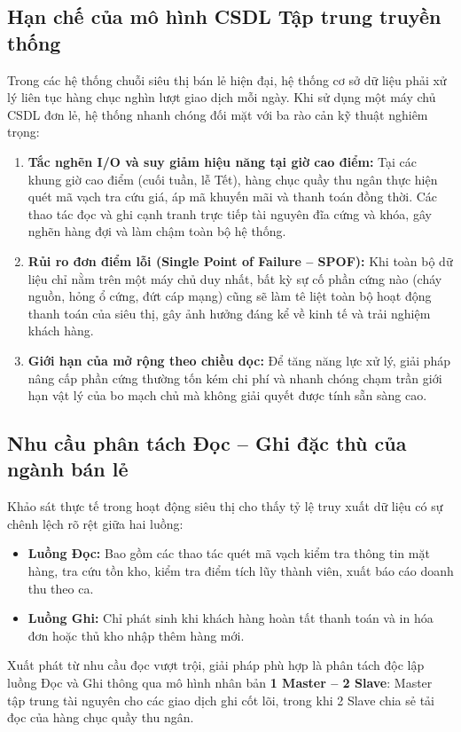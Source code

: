 \documentclass[12pt,a4paper]{report}
\begin{document}
\subsection{Hạn chế của mô hình CSDL Tập trung truyền thống}
Trong các hệ thống chuỗi siêu thị bán lẻ hiện đại, hệ thống cơ sở dữ liệu phải xử lý liên tục hàng chục nghìn lượt giao dịch mỗi ngày. Khi sử dụng một máy chủ CSDL đơn lẻ, hệ thống nhanh chóng đối mặt với ba rào cản kỹ thuật nghiêm trọng:
\begin{enumerate}
    \item \textbf{Tắc nghẽn I/O và suy giảm hiệu năng tại giờ cao điểm:} Tại các khung giờ cao điểm (cuối tuần, lễ Tết), hàng chục quầy thu ngân thực hiện quét mã vạch tra cứu giá, áp mã khuyến mãi và thanh toán đồng thời. Các thao tác đọc và ghi cạnh tranh trực tiếp tài nguyên đĩa cứng và khóa, gây nghẽn hàng đợi và làm chậm toàn bộ hệ thống.
    \item \textbf{Rủi ro đơn điểm lỗi (Single Point of Failure -- SPOF):} Khi toàn bộ dữ liệu chỉ nằm trên một máy chủ duy nhất, bất kỳ sự cố phần cứng nào (cháy nguồn, hỏng ổ cứng, đứt cáp mạng) cũng sẽ làm tê liệt toàn bộ hoạt động thanh toán của siêu thị, gây ảnh hưởng đáng kể về kinh tế và trải nghiệm khách hàng.
    \item \textbf{Giới hạn của mở rộng theo chiều dọc:} Để tăng năng lực xử lý, giải pháp nâng cấp phần cứng thường tốn kém chi phí và nhanh chóng chạm trần giới hạn vật lý của bo mạch chủ mà không giải quyết được tính sẵn sàng cao.
\end{enumerate}

\subsection{Nhu cầu phân tách Đọc -- Ghi đặc thù của ngành bán lẻ}
Khảo sát thực tế trong hoạt động siêu thị cho thấy tỷ lệ truy xuất dữ liệu có sự chênh lệch rõ rệt giữa hai luồng:
\begin{itemize}
    \item \textbf{Luồng Đọc:} Bao gồm các thao tác quét mã vạch kiểm tra thông tin mặt hàng, tra cứu tồn kho, kiểm tra điểm tích lũy thành viên, xuất báo cáo doanh thu theo ca.
    \item \textbf{Luồng Ghi:} Chỉ phát sinh khi khách hàng hoàn tất thanh toán và in hóa đơn hoặc thủ kho nhập thêm hàng mới.
\end{itemize}

Xuất phát từ nhu cầu đọc vượt trội, giải pháp phù hợp là phân tách độc lập luồng Đọc và Ghi thông qua mô hình nhân bản \textbf{1 Master -- 2 Slave}: Master tập trung tài nguyên cho các giao dịch ghi cốt lõi, trong khi 2 Slave chia sẻ tải đọc của hàng chục quầy thu ngân.
\end{document}
